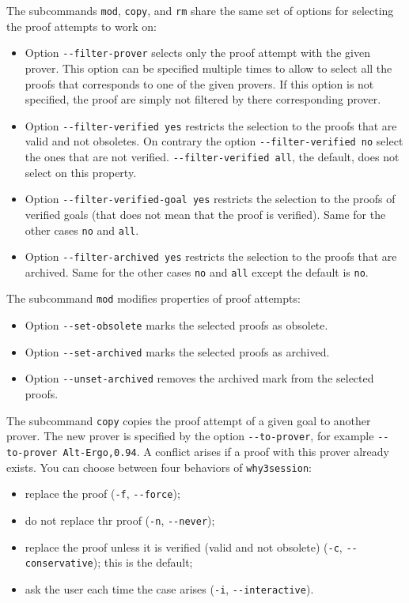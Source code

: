 The subcommands \texttt{mod}, \texttt{copy}, and \texttt{rm} share the
same set of options for selecting the proof attempts to work on:
\begin{itemize}
\item Option \verb|--filter-prover| selects only the proof attempt with
  the given prover. This option can be specified multiple times to
  allow to select all the proofs that corresponds to one of the given
  provers. If this option is not specified, the proof are simply not
  filtered by there corresponding prover.
\item Option \verb|--filter-verified yes| restricts the selection to
  the proofs that are valid and not obsoletes. On contrary the option
  \verb|--filter-verified no| select the ones that are not verified.
  \verb|--filter-verified all|, the default, does not select on this property.
\item Option \verb|--filter-verified-goal yes| restricts the selection
  to the proofs of verified goals (that does not mean that the proof is
  verified). Same for the other cases \verb|no| and \verb|all|.
\item Option \verb|--filter-archived yes| restricts the selection
  to the proofs that are archived. Same for the other cases \verb|no|
  and \verb|all| except the default is \verb|no|.
\end{itemize}

\noindent
The subcommand \texttt{mod} modifies properties of proof
attempts:
\begin{itemize}
\item Option \verb|--set-obsolete| marks the selected proofs as
  obsolete.
\item Option \verb|--set-archived| marks the selected proofs as archived.
\item Option \verb|--unset-archived| removes the archived mark from the selected proofs.
\end{itemize}

The subcommand \texttt{copy} copies the proof attempt of a given goal to another
prover. The new prover is specified by the option
\verb|--to-prover|, for example \texttt{-{}-to-prover Alt-Ergo,0.94}.
A conflict arises if a proof with this prover already exists.
You can choose between four behaviors of \texttt{why3session}:
\begin{itemize}
\item replace the proof (\verb|-f|, \verb|--force|);
\item do not replace thr proof (\verb|-n|, \verb|--never|);
\item replace the proof unless it is verified (valid and not
  obsolete) (\verb|-c|, \verb|--conservative|); this is the default;
\item ask the user each time the case arises (\verb|-i|, \verb|--interactive|).
\end{itemize}


